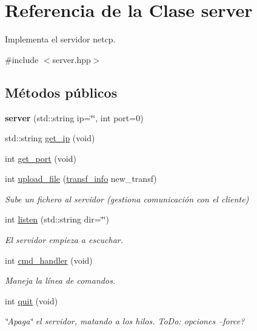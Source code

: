 \hypertarget{classserver}{}\section{Referencia de la Clase server}
\label{classserver}


Implementa el servidor netcp.  




{\ttfamily \#include $<$server.\+hpp$>$}

\subsection*{Métodos públicos}
\begin{DoxyCompactItemize}
\item 
\mbox{\label{classserver_a94f0de46df9f31016034c81e0014c06c}} 
{\bfseries server} (std\+::string ip=\char`\"{}\char`\"{}, int port=0)
\item 
std\+::string \hyperlink{classserver_aa3ffb6541d4295c59a04ca6d72a8bed4}{get\+\_\+ip} (void)
\item 
int \hyperlink{classserver_a85c34ce8e949d74f068025b11bd04bcc}{get\+\_\+port} (void)
\item 
\mbox{\label{classserver_ad7ef99cd7b0f7c529e501f34bd5d7f03}} 
int \hyperlink{classserver_ad7ef99cd7b0f7c529e501f34bd5d7f03}{upload\+\_\+file} (\hyperlink{structtransf__info}{transf\+\_\+info} new\+\_\+transf)
\begin{DoxyCompactList}\small\item\em Sube un fichero al servidor (gestiona comunicación con el cliente) \end{DoxyCompactList}\item 
int \hyperlink{classserver_a6e675f47d2b9eeeba5d8d8775f4ecb22}{listen} (std\+::string dir=\char`\"{}\char`\"{})
\begin{DoxyCompactList}\small\item\em El servidor empieza a escuchar. \end{DoxyCompactList}\item 
\mbox{\label{classserver_af59b03ba12547e371c7f7684d90c46cb}} 
int \hyperlink{classserver_af59b03ba12547e371c7f7684d90c46cb}{cmd\+\_\+handler} (void)
\begin{DoxyCompactList}\small\item\em Maneja la línea de comandos. \end{DoxyCompactList}\item 
\mbox{\label{classserver_a38eb76635aa1e33bd98d4c86a0193dc7}} 
int \hyperlink{classserver_a38eb76635aa1e33bd98d4c86a0193dc7}{quit} (void)
\begin{DoxyCompactList}\small\item\em \char`\"{}\+Apaga\char`\"{} el servidor, matando a los hilos. To\+Do\+: opciones --force? \end{DoxyCompactList}\end{DoxyCompactItemize}


